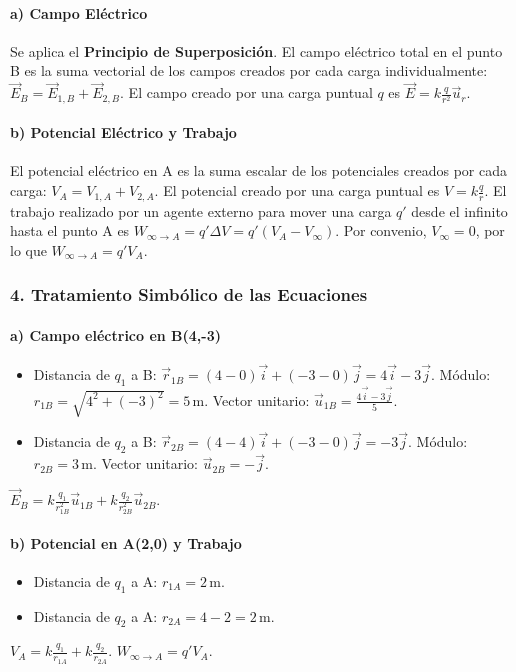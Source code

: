 \paragraph{a) Campo Eléctrico}
Se aplica el \textbf{Principio de Superposición}. El campo eléctrico total en el punto B es la suma vectorial de los campos creados por cada carga individualmente: $\vec{E}_B = \vec{E}_{1,B} + \vec{E}_{2,B}$. El campo creado por una carga puntual $q$ es $\vec{E} = k\frac{q}{r^2}\vec{u}_r$.

\paragraph{b) Potencial Eléctrico y Trabajo}
El potencial eléctrico en A es la suma escalar de los potenciales creados por cada carga: $V_A = V_{1,A} + V_{2,A}$. El potencial creado por una carga puntual es $V = k\frac{q}{r}$. El trabajo realizado por un agente externo para mover una carga $q'$ desde el infinito hasta el punto A es $W_{\infty \to A} = q'\Delta V = q'(V_A - V_\infty)$. Por convenio, $V_\infty=0$, por lo que $W_{\infty \to A} = q'V_A$.

\subsubsection*{4. Tratamiento Simbólico de las Ecuaciones}
\paragraph{a) Campo eléctrico en B(4,-3)}
\begin{itemize}
    \item Distancia de $q_1$ a B: $\vec{r}_{1B} = (4-0)\vec{i} + (-3-0)\vec{j} = 4\vec{i}-3\vec{j}$. Módulo: $r_{1B} = \sqrt{4^2+(-3)^2}=5\,\text{m}$. Vector unitario: $\vec{u}_{1B} = \frac{4\vec{i}-3\vec{j}}{5}$.
    \item Distancia de $q_2$ a B: $\vec{r}_{2B} = (4-4)\vec{i} + (-3-0)\vec{j} = -3\vec{j}$. Módulo: $r_{2B}=3\,\text{m}$. Vector unitario: $\vec{u}_{2B} = -\vec{j}$.
\end{itemize}
$\vec{E}_B = k\frac{q_1}{r_{1B}^2}\vec{u}_{1B} + k\frac{q_2}{r_{2B}^2}\vec{u}_{2B}$.

\paragraph{b) Potencial en A(2,0) y Trabajo}
\begin{itemize}
    \item Distancia de $q_1$ a A: $r_{1A} = 2\,\text{m}$.
    \item Distancia de $q_2$ a A: $r_{2A} = 4-2 = 2\,\text{m}$.
\end{itemize}
$V_A = k\frac{q_1}{r_{1A}} + k\frac{q_2}{r_{2A}}$.
$W_{\infty \to A} = q'V_A$.

